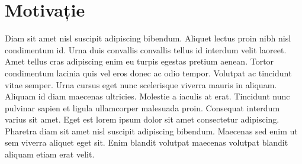 \chapter*{Motivație} 

Diam sit amet nisl suscipit adipiscing bibendum. Aliquet lectus proin nibh nisl condimentum id. Urna duis convallis convallis tellus id interdum velit laoreet. Amet tellus cras adipiscing enim eu turpis egestas pretium aenean. Tortor condimentum lacinia quis vel eros donec ac odio tempor. Volutpat ac tincidunt vitae semper. Urna cursus eget nunc scelerisque viverra mauris in aliquam. Aliquam id diam maecenas ultricies. Molestie a iaculis at erat. Tincidunt nunc pulvinar sapien et ligula ullamcorper malesuada proin. Consequat interdum varius sit amet. Eget est lorem ipsum dolor sit amet consectetur adipiscing. Pharetra diam sit amet nisl suscipit adipiscing bibendum. Maecenas sed enim ut sem viverra aliquet eget sit. Enim blandit volutpat maecenas volutpat blandit aliquam etiam erat velit.